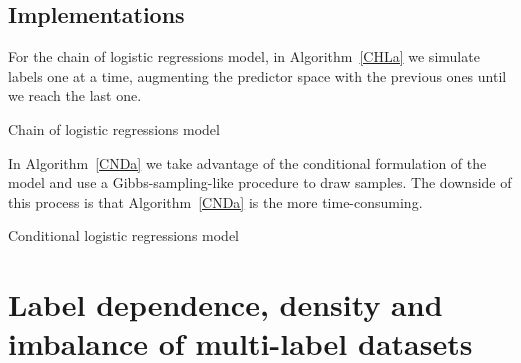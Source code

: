 \documentclass[review]{elsarticle}
\begin{document}
	\subsection{Implementations}
	
	For the chain of logistic regressions model, in Algorithm~\ref{CHLa} we simulate labels one at a time, augmenting the predictor space with the previous ones until we reach the last one.
	\begin{algorithm}[H]
		\caption{Chain of logistic regressions model}\label{CHLa}
		\begin{algorithmic}[1]
			\EndFor
		\end{algorithmic}
	\end{algorithm}
	
	In Algorithm~\ref{CNDa} we take advantage of the conditional formulation of the model and use a Gibbs-sampling-like procedure to draw samples. The downside of this process is that Algorithm~\ref{CNDa} is the more time-consuming.
	\begin{algorithm}[H]
		\caption{Conditional logistic regressions model}\label{CNDa}
		\begin{algorithmic}[1]
			\Repeat
		\end{algorithmic}
	\end{algorithm}
	
	
	\section{Label dependence, density and imbalance of multi-label datasets}\label{s:attributes}
	
\end{document}
